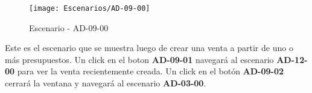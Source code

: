 \begin{figure}[H]
\centering
\texttt{[image: Escenarios/AD-09-00]}
\caption{Escenario - AD-09-00}
\label{fig:AD-09-00}
\end{figure}
Este es el escenario que se muestra luego de crear una venta a partir de uno o más presupuestos. Un click en el boton \textbf{AD-09-01} navegará al escenario \textbf{AD-12-00} para ver la venta recientemente creada. Un click en el botón \textbf{AD-09-02} cerrará la ventana y navegará al escenario \textbf{AD-03-00}.
\clearpage
